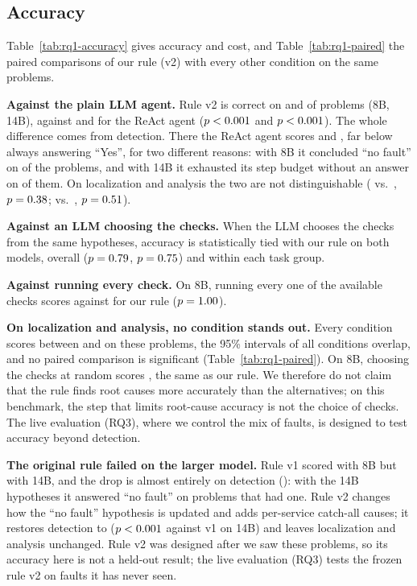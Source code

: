 \subsection{Accuracy}
\label{sec:rq1-accuracy}

Table~\ref{tab:rq1-accuracy} gives accuracy and cost, and Table~\ref{tab:rq1-paired} the paired
comparisons of our rule (v2) with every other condition on the same problems.

\textbf{Against the plain LLM agent.} Rule v2 is correct on \accOursEight{} and
\accOursFourteen{} of problems (8B, 14B), against \accReactEight{} and \accReactFourteen{} for
the ReAct agent ($p<0.001$ and $p<0.001$). The whole difference comes from
detection. There the ReAct agent scores \accDetReactEight{} and \accDetReactFourteen{}, far below
always answering ``Yes'', for two different reasons: with 8B it concluded ``no fault'' on
\reactDetNoEight{} of the \nDetection{} problems, and with 14B it exhausted its step budget
without an answer on \reactDetBudgetFourteen{} of them. On localization and analysis the two
are not distinguishable (\accLAOursEight{} vs.\ \accLAReactEight{}, $p=0.38$;
\accLAOursFourteen{} vs.\ \accLAReactFourteen{}, $p=0.51$).

\textbf{Against an LLM choosing the checks.} When the LLM chooses the checks from the same
hypotheses, accuracy is statistically tied with our rule on both models, overall
($p=0.79$, $p=0.75$) and within each task group.

\textbf{Against running every check.} On 8B, running every one of the available checks scores
\accEveryEight{} against \accOursEight{} for our rule ($p=1.00$).

\textbf{On localization and analysis, no condition stands out.} Every condition scores between
\accLAReactEight{} and \accLAChooseFourteen{} on these \nLocAna{} problems, the 95\% intervals
of all conditions overlap, and no paired comparison is significant
(Table~\ref{tab:rq1-paired}). On 8B, choosing the checks at random scores \accLARandomEight{},
the same as our rule. We therefore do not claim that the rule finds root causes more accurately
than the alternatives; on this benchmark, the step that limits root-cause accuracy is not the
choice of checks. The live evaluation (RQ3), where we control the mix of
faults, is designed to test accuracy beyond detection.

\textbf{The original rule failed on the larger model.} Rule v1 scored \accVOneEight{} with 8B
but \accVOneFourteen{} with 14B, and the drop is almost entirely on detection
(\accDetVOneFourteen{}): with the 14B hypotheses it answered ``no fault'' on problems that had
one. Rule v2 changes how the ``no fault'' hypothesis is updated and adds per-service catch-all
causes; it restores detection to \accDetOursFourteen{} ($p<0.001$ against v1 on 14B)
and leaves localization and analysis unchanged. Rule v2 was designed after we saw these
problems, so its accuracy here is not a held-out result; the live evaluation (RQ3) tests the frozen
rule v2 on faults it has never seen.

